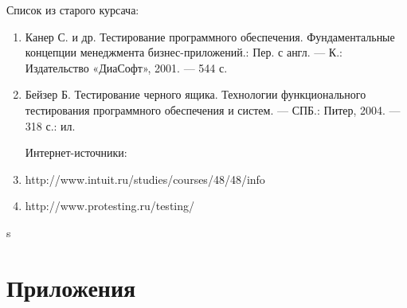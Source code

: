 \documentclass[a4paper,12pt]{article}
\begin{document}
Список из старого курсача:
\begin{enumerate}
\item Канер С.  и др. Тестирование  программного  обеспечения.  Фундаментальные  концепции  
менеджмента бизнес-приложений.:  Пер.  с англ.  —  К.:  Издательство  «ДиаСофт»,  2001.  —  544  с.  
\item Бейзер Б. Тестирование черного ящика. Технологии функционального тестирования программного обеспечения и систем.  —  СПБ.: Питер, 2004.  —  318 с.: ил.
\par Интернет-источники:
\item http://www.intuit.ru/studies/courses/48/48/info
\item http://www.protesting.ru/testing/
\end{enumerate}





\renewcommand\refname{Список использованных источников}
\nocite{*}s


\newpage\section*{Приложения}
\end{document}
